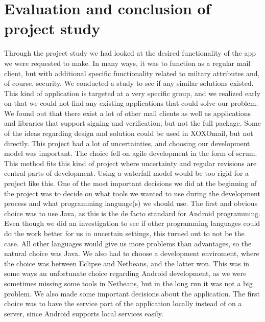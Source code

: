 \pagebreak
\section{Evaluation and conclusion of project study}
Through the project study we had looked at the desired functionality of the app we were requested to make. In many ways, it was to function as a regular mail client, but with additional specific functionality related to miltary attributes and, of course, security. We conducted a study to see if any similar solutions existed. This kind of application is targeted at a very specific group, and we realized early on that we could not find any existing applications that could solve our problem. We found out that there exist a lot of other mail clients as well as applications and libraries that support signing and verification, but not the full package. Some of the ideas regarding design and solution could be used in XOXOmail, but not directly.
\newline\newline
This project had a lot of uncertainties, and choosing our development model was important. The choice fell on agile development in the form of scrum. This method fits this kind of project where uncertainty and regular revisions are central parts of development. Using a waterfall model would be too rigid for a project like this.
\newline\newline
One of the most important decisions we did at the beginning of the project was to decide on what tools we wanted to use during the development process and what programming language(s) we should use. The first and obvious choice was to use Java, as this is the de facto standard for Android programming. Even though we did an investigation to see if other programming languages could do the work better for us in uncertain settings, this turned out to not be the case. All other languages would give us more problems than advantages, so the natural choice was Java. We also had to choose a development enviroment, where the choice was between Eclipse and Netbeans, and the latter won.  This was in some ways an unfortunate choice regarding Android development, as we were sometimes missing some tools in Netbeans, but in the long run it was not a big problem.
\newline\newline
We also made some important decisions about the application. The first choice was to have the service part of the application locally instead of on a server, since Android supports local services easily.
